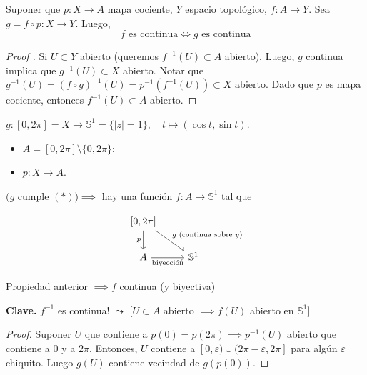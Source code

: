 \begin{property}
	Suponer que $p: X \to A$ mapa cociente, $Y$ espacio topológico, $f: A \to Y$. Sea $g = f \circ p : X \to Y$. Luego,
	\[ f \text{ es continua} \iff g \text{ es continua} \]
\end{property}
\begin{proof}[Proof ]
	\Ifstep Si $U\subset Y$ abierto (queremos $f^{-1}(U) \subset A$ abierto). Luego, $g$ continua implica que $g^{-1}(U)\subset X$ abierto. Notar que $g^{-1}(U) = (f\circ g)^{-1}(U) = p^{-1}(f^{-1}(U)) \subset X$ abierto. Dado que $p$ es mapa cociente, entonces $f^{-1}(U) \subset A$ abierto.
\end{proof}

\begin{eg}
	$g : [0,2\pi] = X \to \mathbb{S}^1 = \{|z| = 1\},\quad t \mapsto (\cos t,\sin t)$.
	\begin{itemize}
		\item $A = [0,2\pi] \setminus \{0,2\pi\}$;

		\item $p: X \to A$.
	\end{itemize}
	$(g$ cumple $(*)) \implies$ hay una función $f: A \to \mathbb{S}^1$ tal que 

	\[
	\begin{tikzcd}
		{[0,2\pi]} \arrow[d, "p"'] \arrow[rd, "g \text{ (continua sobre } y)"] &              \\
		A \arrow[r, "\text{biyección}"']                                                 & \mathbb{S}^1
	\end{tikzcd}
	\]
\end{eg}

\noindent Propiedad anterior $\implies f$ continua (y biyectiva) \newline

\noindent \textbf{Clave.} $f^{-1}$ es continua! $\leadsto$ [$U\subset A$ abierto $\implies f(U)$ abierto en $\mathbb{S}^1$]

\begin{proof}
	Suponer $U$ que contiene a $p(0) = p(2\pi) \implies p^{-1}(U)$ abierto que contiene a $0$ y a $2\pi$. Entonces, $U$ contiene a $[0,\varepsilon)\cup (2\pi-\varepsilon,2\pi]$ para algún $\varepsilon$ chiquito. Luego $g(U)$ contiene vecindad de $g(p(0))$.
\end{proof}
